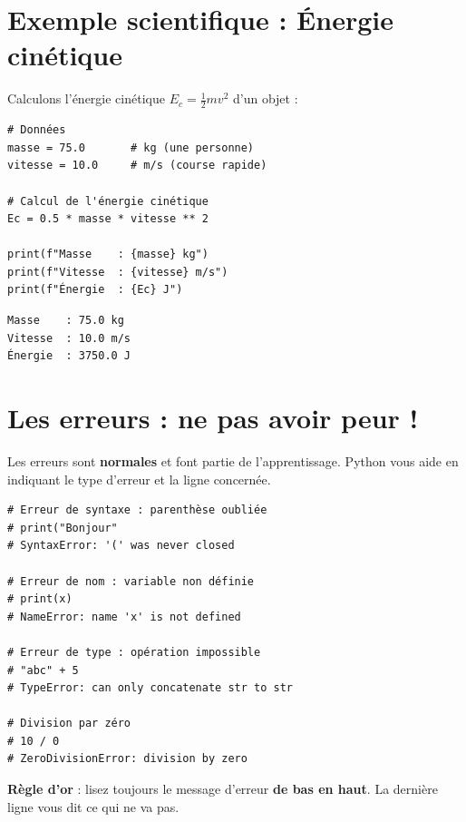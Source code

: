 \section{Exemple scientifique : \'Energie cin\'etique}

Calculons l'\'energie cin\'etique $E_c = \frac{1}{2}mv^2$ d'un objet :

\begin{codeblock}[title=\textbf{Python --- \'Energie cin\'etique}]
\begin{verbatim}
# Données
masse = 75.0       # kg (une personne)
vitesse = 10.0     # m/s (course rapide)

# Calcul de l'énergie cinétique
Ec = 0.5 * masse * vitesse ** 2

print(f"Masse    : {masse} kg")
print(f"Vitesse  : {vitesse} m/s")
print(f"Énergie  : {Ec} J")
\end{verbatim}
\end{codeblock}

\begin{codeoutput}
\begin{verbatim}
Masse    : 75.0 kg
Vitesse  : 10.0 m/s
Énergie  : 3750.0 J
\end{verbatim}
\end{codeoutput}

\section{Les erreurs : ne pas avoir peur !}

\begin{errmark}
Les erreurs sont \textbf{normales} et font partie de l'apprentissage. Python vous aide en indiquant le type d'erreur et la ligne concern\'ee.

\begin{codeblock}[title=\textbf{Python --- Erreurs courantes}]
\begin{verbatim}
# Erreur de syntaxe : parenthèse oubliée
# print("Bonjour"
# SyntaxError: '(' was never closed

# Erreur de nom : variable non définie
# print(x)
# NameError: name 'x' is not defined

# Erreur de type : opération impossible
# "abc" + 5
# TypeError: can only concatenate str to str

# Division par zéro
# 10 / 0
# ZeroDivisionError: division by zero
\end{verbatim}
\end{codeblock}

\textbf{R\`egle d'or} : lisez toujours le message d'erreur \textbf{de bas en haut}. La derni\`ere ligne vous dit ce qui ne va pas.
\end{errmark}

